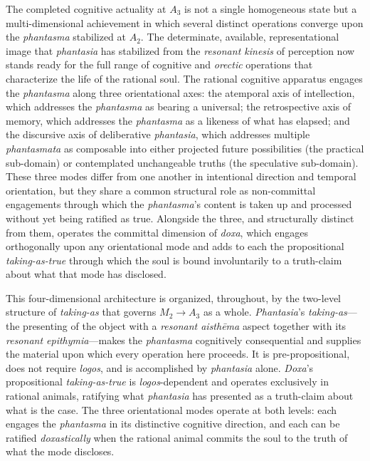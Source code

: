 \documentclass{article}
\begin{document}
The completed cognitive actuality at $A_3$ is not a single homogeneous state but a multi-dimensional achievement in which several distinct operations converge upon the \textit{phantasma} stabilized at $A_2$. The determinate, available, representational image that \textit{phantasia} has stabilized from the \textit{resonant kinesis} of perception now stands ready for the full range of cognitive and \textit{orectic} operations that characterize the life of the rational soul. The rational cognitive apparatus engages the \textit{phantasma} along three orientational axes: the atemporal axis of intellection, which addresses the \textit{phantasma} as bearing a universal; the retrospective axis of memory, which addresses the \textit{phantasma} as a likeness of what has elapsed; and the discursive axis of deliberative \textit{phantasia}, which addresses multiple \textit{phantasmata} as composable into either projected future possibilities (the practical sub-domain) or contemplated unchangeable truths (the speculative sub-domain). These three modes differ from one another in intentional direction and temporal orientation, but they share a common structural role as non-committal engagements through which the \textit{phantasma}'s content is taken up and processed without yet being ratified as true. Alongside the three, and structurally distinct from them, operates the committal dimension of \textit{doxa}, which engages orthogonally upon any orientational mode and adds to each the propositional \textit{taking-as-true} through which the soul is bound involuntarily to a truth-claim about what that mode has disclosed.

This four-dimensional architecture is organized, throughout, by the two-level structure of \textit{taking-as} that governs $M_2 \rightarrow A_3$ as a whole. \textit{Phantasia}'s \textit{taking-as}---the presenting of the object with a \textit{resonant aisthēma} aspect together with its \textit{resonant epithymia}---makes the \textit{phantasma} cognitively consequential and supplies the material upon which every operation here proceeds. It is pre-propositional, does not require \textit{logos}, and is accomplished by \textit{phantasia} alone. \textit{Doxa}'s propositional \textit{taking-as-true} is \textit{logos}-dependent and operates exclusively in rational animals, ratifying what \textit{phantasia} has presented as a truth-claim about what is the case. The three orientational modes operate at both levels: each engages the \textit{phantasma} in its distinctive cognitive direction, and each can be ratified \textit{doxastically} when the rational animal commits the soul to the truth of what the mode discloses. 
\end{document}
